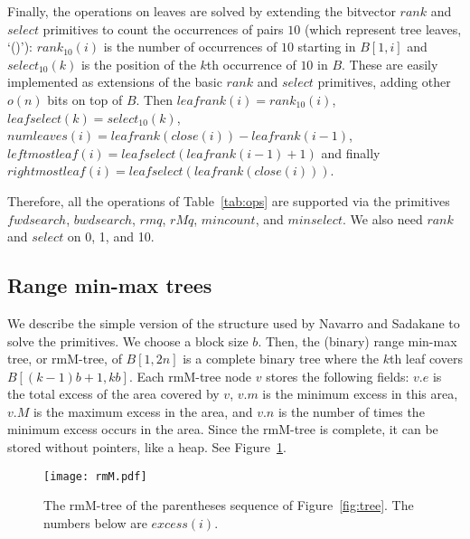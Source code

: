 \documentclass[11pt]{article}
\newcommand{\0}{\mathit{0}}
\newcommand{\1}{\mathit{1}}
\newcommand{\rank}{\mathit{rank}}
\newcommand{\select}{\mathit{select}}
\newcommand{\excess}{\mathit{excess}}
\newcommand{\numleaves}{\mathit{numleaves}}
\newcommand{\leafrank}{\mathit{leafrank}}
\newcommand{\leafselect}{\mathit{leafselect}}
\newcommand{\leftmostleaf}{\mathit{leftmostleaf}}
\newcommand{\rightmostleaf}{\mathit{rightmostleaf}}
\newcommand{\fwdsearch}{\mathit{fwdsearch}}
\newcommand{\bwdsearch}{\mathit{bwdsearch}}
\newcommand{\close}{\mathit{close}}
\newcommand{\rmq}{\mathit{rmq}}
\newcommand{\rMq}{\mathit{rMq}}
\newcommand{\mincount}{\mathit{mincount}}
\newcommand{\minselect}{\mathit{minselect}}
\begin{document}
Finally, the operations on leaves are solved by extending the bitvector 
$\rank$ and $\select$ primitives to count the occurrences of pairs $10$ (which 
represent tree leaves, `()'): $\rank_{10}(i)$ is the number of occurrences of 
$10$ starting in $B[1,i]$ and $\select_{10}(k)$ is the position of the $k$th
occurrence of $10$ in $B$. These are easily implemented as extensions of the 
basic $\rank$ and $\select$ primitives, adding other $o(n)$ bits on top of
$B$. Then 
$\leafrank(i)=\rank_{10}(i)$, $\leafselect(k)= \select_{10}(k)$, 
$\numleaves(i)=\leafrank(\close(i))-\leafrank(i-1)$,
$\leftmostleaf(i) = \leafselect(\leafrank(i-1)+1)$ and finally
$\rightmostleaf(i) = \leafselect(\leafrank(\close(i)))$.

Therefore, all the operations of Table~\ref{tab:ops} are supported via the
primitives $\fwdsearch$, $\bwdsearch$, $\rmq$, $\rMq$, $\mincount$, and
$\minselect$. We also need $\rank$ and $\select$ on 0, 1, and 10.

\subsection{Range min-max trees}

We describe the simple version of the structure used by Navarro and Sadakane 
\cite{NS14} to solve the primitives. 
We choose a block size $b$. Then, the (binary) range 
min-max tree, or rmM-tree, of $B[1,2n]$ is a complete binary tree where the 
$k$th leaf covers $B[(k-1)b+1,kb]$. Each rmM-tree node $v$ stores the following
fields: $v.e$ is the total excess of the area covered by $v$, $v.m$ is the
minimum excess in this area, $v.M$ is the maximum excess in the area, and
$v.n$ is the number of times the minimum excess occurs in the area. Since the
rmM-tree is complete, it can be stored without pointers, like a heap.
See Figure~\ref{fig:rmM}.

\begin{figure}[t]
\centerline{\texttt{[image: rmM.pdf]}}
\caption{The rmM-tree of the parentheses sequence of Figure~\ref{fig:tree}.
The numbers below are $\excess(i)$.}
\label{fig:rmM}
\end{figure}
\end{document}
